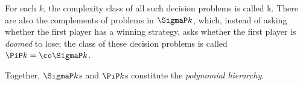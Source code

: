 
For each \(k\), the complexity class of all such decision problems is called
\SigmaP k.  There are also the complements of problems in \(\SigmaP k\), which,
instead of asking whether the first player has a winning strategy, asks whether
the first player is \emph{doomed} to lose; the class of these decision problems
is called \(\PiP k=\co\SigmaP k\).

Together, \(\SigmaP k\)s and \(\PiP k\)s constitute the \emph{polynomial
hierarchy}.

